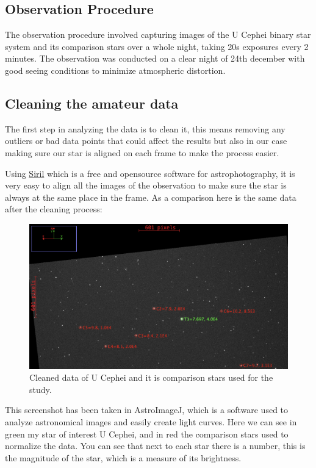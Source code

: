 \documentclass[12pt,a4paper]{article}
\begin{document}
\subsection{Observation Procedure}

The observation procedure involved capturing images of the U Cephei binary star system and its comparison stars over a whole night, taking 20s exposures every 2 minutes.
The observation was conducted on a clear night of 24th december with good seeing conditions to minimize atmospheric distortion.

\subsection{Cleaning the amateur data}

The first step in analyzing the data is to clean it, this means removing any outliers or bad data points that could affect the results but also in our case making sure our star is aligned on each frame to make the process easier.

\bigskip

Using \href{https://siril.org/fr/}{Siril} which is a free and opensource software for astrophotography, it is very easy to align all the images of the observation to make sure the star is always at the same place in the frame.
As a comparison here is the same data after the cleaning process:

\begin{figure}[H]
    \centering
    \includegraphics[width=1\textwidth]{assets/aligned.png}
    \caption{Cleaned data of U Cephei and it is comparison stars used for the study.}
    \label{fig:cleaned_data}
\end{figure}

This screenshot has been taken in AstroImageJ, which is a software used to analyze astronomical images and easily create light curves.
Here we can see in green my star of interest U Cephei, and in red the comparison stars used to normalize the data.
You can see that next to each star there is a number, this is the magnitude of the star, which is a measure of its brightness.
\end{document}
